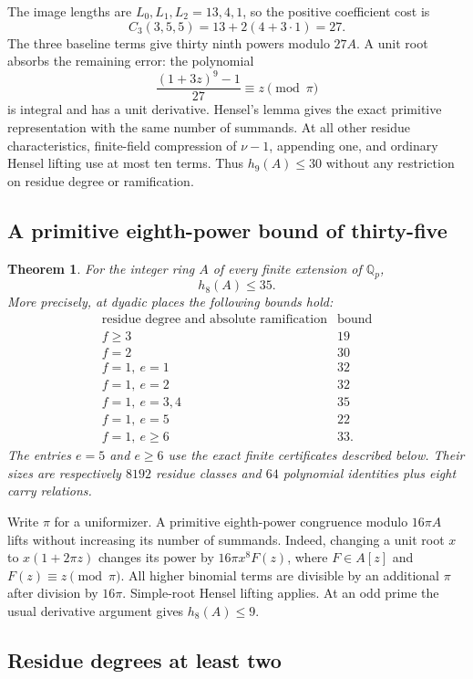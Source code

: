 \documentclass[11pt,reqno]{amsart}
\numberwithin{equation}{section}
\newtheorem{theorem}{Theorem}[section]
\theoremstyle{definition}
\begin{document}
The image lengths are $L_0,L_1,L_2=13,4,1$, so the positive
coefficient cost is
\[
 C_3(3,5,5)=13+2(4+3\cdot1)=27.
\]
The three baseline terms give thirty ninth powers modulo $27A$.
A unit root absorbs the remaining error: the polynomial
\[
 \frac{(1+3z)^9-1}{27}\equiv z\pmod\pi
\]
is integral and has a unit derivative. Hensel's lemma gives the
exact primitive representation with the same number of summands.
At all other residue characteristics, finite-field compression of
$\nu-1$, appending one, and ordinary Hensel lifting use at most ten
terms. Thus $h_9(A)\le30$ without any restriction on residue degree
or ramification.

\subsection{A primitive eighth-power bound of thirty-five}

\begin{theorem}\label{thm:local-eighth-thirtyfive}
For the integer ring $A$ of every finite extension of $\mathbb Q_p$,
\[
 h_8(A)\le35.
\]
More precisely, at dyadic places the following bounds hold:
\[
 \begin{array}{c|c}
 \text{residue degree and absolute ramification}&\text{bound}\\\hline
 f\ge3&19\\
 f=2&30\\
 f=1,\ e=1&32\\
 f=1,\ e=2&32\\
 f=1,\ e=3,4&35\\
 f=1,\ e=5&22\\
 f=1,\ e\ge6&33.
 \end{array}
\]
The entries $e=5$ and $e\ge6$ use the exact finite certificates
described below. Their sizes are respectively $8192$ residue classes
and $64$ polynomial identities plus eight carry relations.
\end{theorem}

Write $\pi$ for a uniformizer. A primitive eighth-power congruence
modulo $16\pi A$ lifts without increasing its number of summands.
Indeed, changing a unit root $x$ to $x(1+2\pi z)$ changes its power by
$16\pi x^8F(z)$, where $F\in A[z]$ and $F(z)\equiv z\pmod\pi$.
All higher binomial terms are divisible by an additional $\pi$ after
division by $16\pi$. Simple-root Hensel lifting applies.
At an odd prime the usual derivative argument gives $h_8(A)\le9$.

\subsection{Residue degrees at least two}
\end{document}
